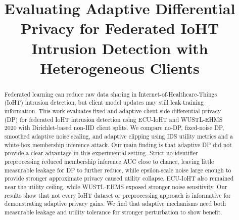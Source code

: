 \documentclass[conference]{IEEEtran}
\begin{document}
\title{Evaluating Adaptive Differential Privacy for Federated IoHT Intrusion Detection with Heterogeneous Clients}

\author{  
\and
{} 
\and
{}  }

\maketitle

\begin{abstract}
Federated learning can reduce raw data sharing in Internet-of-Healthcare-Things
(IoHT) intrusion detection, but client model updates may still leak training
information. This work evaluates fixed and adaptive client-side differential
privacy (DP) for federated IoHT intrusion detection using ECU-IoHT and
WUSTL-EHMS 2020 with Dirichlet-based non-IID client splits. We compare no-DP,
fixed-noise DP, smoothed adaptive noise scaling, and adaptive clipping using IDS
utility metrics and a white-box membership inference attack. Our main finding is
that adaptive DP did not provide a clear advantage in this experimental setting.
Strict no-identifier preprocessing reduced membership inference AUC close to
chance, leaving little measurable leakage for DP to further reduce, while
epsilon-scale noise large enough to provide stronger approximate privacy caused
utility collapse. ECU-IoHT also remained near the utility ceiling, while
WUSTL-EHMS exposed stronger noise sensitivity. Our results show that not every
IoHT dataset or preprocessing approach is informative for demonstrating adaptive
privacy gains. We find that adaptive mechanisms need both measurable leakage and
utility tolerance for stronger perturbation to show benefit.
\end{abstract}
\end{document}
